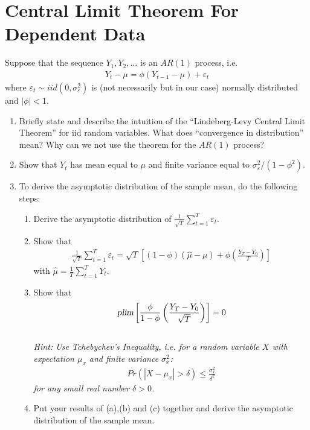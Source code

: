 \section[Central Limit Theorem For Dependent Data]{Central Limit Theorem For Dependent Data\label{ex:CentralLimitTheoremDependentData}}
Suppose that the sequence $Y_{1},Y_{2},\ldots $ is an $AR(1)$ process, i.e.
\begin{align*}
Y_{t}-\mu =\phi \left(Y_{t-1}-\mu\right) +\varepsilon _{t}
\end{align*}
where $\varepsilon _{t}\sim iid(0,\sigma _{\varepsilon }^{2})$ is
  (not necessarily but in our case) normally distributed and $|\phi |<1$.
\begin{enumerate}
\item Briefly state and describe the intuition of the \enquote{Lindeberg-Levy Central Limit Theorem} for iid random variables.
What does \enquote{convergence in distribution} mean?
Why can we not use the theorem for the $AR(1)$ process?
\item Show that $Y_t$ has mean equal to $\mu $ and finite variance equal to $\sigma_\varepsilon^2/(1-\phi^2)$.
\item To derive the asymptotic distribution of the sample mean, do the following steps:
\begin{enumerate}
	\item Derive the asymptotic distribution of $\frac{1}{\sqrt{T} } \sum_{t=1}^T \varepsilon_t$.
	\item Show that
	\begin{align*}
		\frac{1}{\sqrt{T}} \sum_{t=1}^T \varepsilon_t = \sqrt{T}\left[(1-\phi)\left(\hat{\mu}-\mu\right) + \phi\left(\frac{Y_T - Y_0}{T}\right)\right]
	\end{align*}
	with $\hat{\mu} =\frac{1}{T}\sum_{t=1}^{T}Y_{t}$.
	\item Show that
	\begin{align*}
	\textsl{plim}\left[\frac{\phi}{1-\phi}\left(\frac{Y_T - Y_0}{\sqrt{T}}\right)\right] = 0
	\end{align*}
	\\\emph{Hint: Use Tchebychev's Inequality,
	i.e. for a random variable $X$ with expectation $\mu_x$
	and finite variance $\sigma_x^2$:}
	\begin{align*}
	Pr(|X-\mu_x|> \delta) \leq \frac{\sigma_x^2}{\delta^2}
	\end{align*}
	\emph{for any small real number $\delta>0$.}
	\item Put your results of (a),(b) and (c) together and derive the asymptotic distribution of the sample mean.

\end{enumerate}
\end{enumerate}
